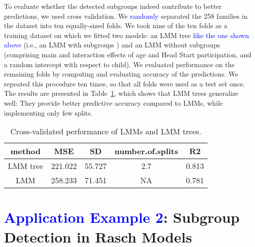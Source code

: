 \documentclass[doc,floatsintext,natbib]{apa7}
\newcommand{\edc}[1]{\textcolor{blue}{#1}}
\begin{document}
To evaluate whether the detected subgroups indeed contribute to better predictions, we used cross validation. We \edc{randomly} separated the 258 families in the dataset into ten equally-sized folds. We took nine of the ten folds as a training dataset on which we fitted two models: an LMM tree \edc{like the one shown above} (i.e., an LMM with subgroups ) and an LMM without subgroups (comprising main and interaction effects of age and Head Start participation, and a random intercept with respect to child). We evaluated performance on the remaining folds by computing and evaluating accuracy of the predictions.  We repeated this procedure ten times, so that all folds were used as a test set once. The results are presented in Table~\ref{tab:performance}, which shows that LMM trees generalize well: They provide better predictive accuracy compared to LMMs, while implementing only few splits. 





\begin{table}

\caption{\label{tab:performance}Cross-validated performance of LMMs and LMM trees.}
\begin{tabular}[t]{ccccc}
\toprule
method & MSE & SD & number.of.splits & R2\\
\midrule
LMM tree & 221.022 & 55.727 & 2.7 & 0.813\\
LMM & 258.233 & 71.451 & NA & 0.781\\
\bottomrule
\end{tabular}
\end{table}





\newpage
\FloatBarrier
\section{\edc{Application Example 2}: Subgroup Detection in Rasch Models}
\label{sec:TutorialRasch}
\end{document}
